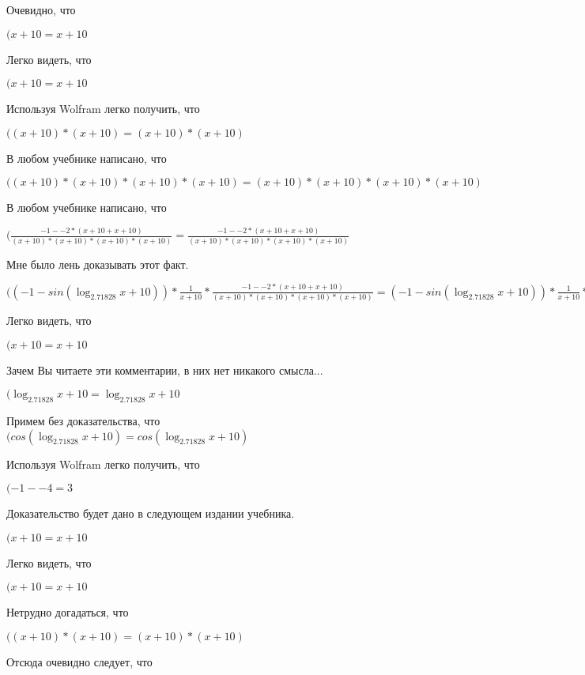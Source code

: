 \documentclass[12pt,a4paper,fleqn]{article}
\theoremstyle{definition}
\begin{document}
Очевидно, что

$( x  +  10  =  x  +  10 $

Легко видеть, что

$( x  +  10  =  x  +  10 $

Используя Wolfram легко получить, что

$(( x  +  10 ) * ( x  +  10 ) = ( x  +  10 ) * ( x  +  10 )$

В любом учебнике написано, что

$(( x  +  10 ) * ( x  +  10 ) * ( x  +  10 ) * ( x  +  10 ) = ( x  +  10 ) * ( x  +  10 ) * ( x  +  10 ) * ( x  +  10 )$

В любом учебнике написано, что

$(\frac{ -1  -  -2  * ( x  +  10  +  x  +  10 )}{( x  +  10 ) * ( x  +  10 ) * ( x  +  10 ) * ( x  +  10 )}
 = \frac{ -1  -  -2  * ( x  +  10  +  x  +  10 )}{( x  +  10 ) * ( x  +  10 ) * ( x  +  10 ) * ( x  +  10 )}
$

Мне было лень доказывать этот факт.

$(( -1  - sin(\log_{ 2.71828 }{ x  +  10 })) * \frac{ 1 }{ x  +  10 }
 * \frac{ -1  -  -2  * ( x  +  10  +  x  +  10 )}{( x  +  10 ) * ( x  +  10 ) * ( x  +  10 ) * ( x  +  10 )}
 = ( -1  - sin(\log_{ 2.71828 }{ x  +  10 })) * \frac{ 1 }{ x  +  10 }
 * \frac{ -1  -  -2  * ( x  +  10  +  x  +  10 )}{( x  +  10 ) * ( x  +  10 ) * ( x  +  10 ) * ( x  +  10 )}
$

Легко видеть, что

$( x  +  10  =  x  +  10 $

Зачем Вы читаете эти комментарии, в них нет никакого смысла...

$(\log_{ 2.71828 }{ x  +  10 } = \log_{ 2.71828 }{ x  +  10 }$

Примем без доказательства, что
$(cos(\log_{ 2.71828 }{ x  +  10 }) = cos(\log_{ 2.71828 }{ x  +  10 })$

Используя Wolfram легко получить, что

$( -1  -  -4  =  3 $

Доказательство будет дано в следующем издании учебника.

$( x  +  10  =  x  +  10 $

Легко видеть, что

$( x  +  10  =  x  +  10 $

Нетрудно догадаться, что

$(( x  +  10 ) * ( x  +  10 ) = ( x  +  10 ) * ( x  +  10 )$

Отсюда очевидно следует, что
\end{document}
